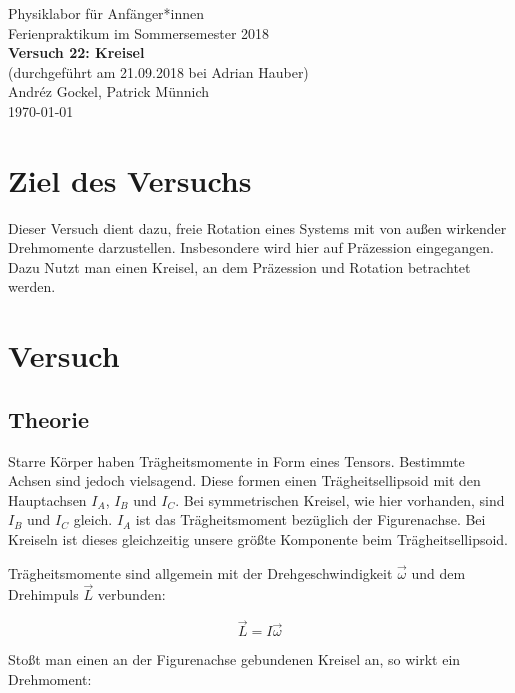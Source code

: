 \documentclass[11pt,a4paper]{article}
\begin{document}
{
\centering 
\large 
Physiklabor für Anf\"anger*innen \\
Ferienpraktikum im Sommersemester 2018 \\[4mm]
\textbf{\LARGE 
Versuch 22: Kreisel
} \\[3mm]
(durchgef\"uhrt am 21.09.2018 bei Adrian Hauber) \\
Andréz Gockel, Patrick M\"unnich\\
\today \\[10mm]
}

\vspace{50pt}
\tableofcontents
\vspace{22pt}
\listoftables
\vspace{22pt}
\listoffigures
\pagebreak

\section{Ziel des Versuchs}

Dieser Versuch dient dazu, freie Rotation eines Systems mit von au\ss en wirkender Drehmomente darzustellen. Insbesondere wird hier auf Pr\"azession eingegangen. Dazu Nutzt man einen Kreisel, an dem Pr\"azession und Rotation betrachtet werden.

\section{Versuch}

\subsection{Theorie}

Starre K\"orper haben Tr\"agheitsmomente in Form eines Tensors. Bestimmte Achsen sind jedoch vielsagend. Diese formen einen Tr\"agheitsellipsoid mit den Hauptachsen $I_A$, $I_B$ und $I_C$. Bei symmetrischen Kreisel, wie hier vorhanden, sind $I_B$ und $I_C$ gleich. $I_A$ ist das Tr\"agheitsmoment bez\"uglich der Figurenachse. Bei Kreiseln ist dieses gleichzeitig unsere gr\"o\ss te Komponente beim Tr\"agheitsellipsoid.

Tr\"agheitsmomente sind allgemein mit der Drehgeschwindigkeit $\vec{\omega}$ und dem Drehimpuls $\vec{L}$ verbunden:

\begin{equation}
\vec{L}=I\vec{\omega}
\end{equation}

Sto\ss t man einen an der Figurenachse gebundenen Kreisel an, so wirkt ein Drehmoment:
\end{document}
